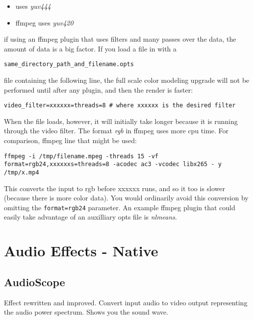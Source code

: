 \begin{itemize}[noitemsep]
    \item \CGG{} uses \textit{yuv444}
    \item ffmpeg uses \textit{yuv420}
\end{itemize}

if using an ffmpeg plugin that uses filters and many passes over the data, the amount of data is a big factor. If you load a file in \CGG{} with a

\texttt{same\_directory\_path\_and\_filename.opts}

file containing the following line, the full scale color modeling upgrade will not be performed until after any plugin, and then the render is faster:

\begin{lstlisting}[style=sh]
video_filter=xxxxxx=threads=8 # where xxxxxx is the desired filter
\end{lstlisting}

When the file loads, however, it will initially take longer because it is running through the video filter. The format \textit{rgb} in ffmpeg uses more cpu time. For comparison, ffmpeg line that might be used:

\begin{lstlisting}[style=sh]
ffmpeg -i /tmp/filename.mpeg -threads 15 -vf format=rgb24,xxxxxxs=threads=8 -acodec ac3 -vcodec libx265 - y /tmp/x.mp4
\end{lstlisting}

This converts the input to rgb before xxxxxx runs, and so it too is slower (because there is more color data). You would ordinarily avoid this conversion by omitting the \texttt{format=rgb24} parameter. An example ffmpeg plugin that could easily take advantage of an auxilliary opts file is \textit{nlmeans}.

\section{Audio Effects - Native}%
\label{sec:audio_effects_native}

\subsection{AudioScope}%
\label{sub:audioscope}

Effect rewritten and improved. Convert input audio to video output representing the audio power spectrum. Shows
you the sound wave.


